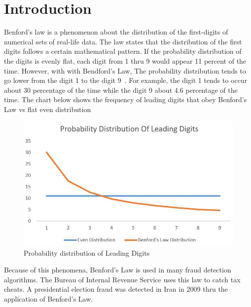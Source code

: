 
\maketitle

\section{Introduction}
Benford’s law is a phenomenon about the distribution 
of the first-digits of numerical sets of real-life data. 
The law states that the distribution of the first digits
follows a certain mathematical pattern. If the probability 
distribution of the digits is evenly flat, each digit from 
1 thru 9 would appear 11 percent of the time. However, 
with with Bendford’s Law, The probability distribution 
tends to go lower from the digit 1 to the digit 
9~\cite{hid-sp18-514-benfordwiki}.
For example, the digit 1 tends to occur about 30 percentage 
of the time while the digit 9 about 4.6 percentage 
of the time. The chart below shows the frequency of 
leading digits that obey Benford’s Law vs flat even distribution


\begin{figure}[!ht]
\centering\includegraphics[width=\columnwidth]{images/probability_dist.JPG}
  \caption{Probability distribution of Leading Digits}\label{f:prob-dist-lead}
\end{figure}

Because of this phenomena, Benford’s Law is used in many 
fraud detection algorithms. The Bureau of Internal Revenue 
Service uses this law to catch tax cheats. 
A presidential election fraud was detected in 
Iran in 2009 thru the application of Benford’s Law.


